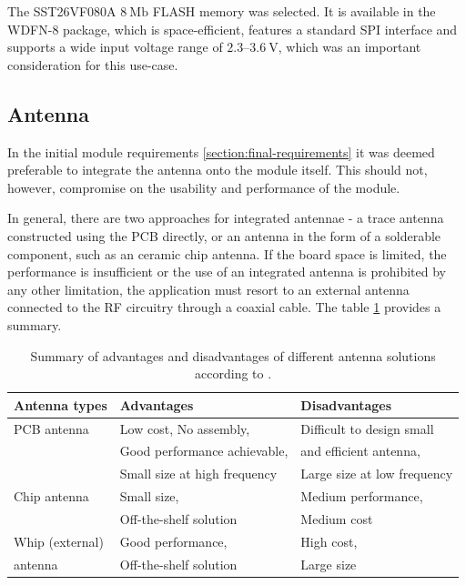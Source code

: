 The SST26VF080A $8~\mathrm{Mb}$ FLASH memory was selected. It is available in the WDFN-8 package, which is space-efficient, features a standard SPI interface and supports a wide input voltage range of $2.3\text{--}3.6~\mathrm{V}$, which was an important consideration for this use-case.

\subsection{\label{section:antenna}Antenna}
In the initial module requirements \ref{section:final-requirements} it was deemed preferable to integrate the antenna onto the module itself. This should not, however, compromise on the usability and performance of the module. 

In general, there are two approaches for integrated antennae - a trace antenna constructed using the PCB directly, or an antenna in the form of a solderable component, such as an ceramic chip antenna. If the board space is limited, the performance is insufficient or the use of an integrated antenna is prohibited by any other limitation, the application must resort to an external antenna connected to the RF circuitry through a coaxial cable. The table \ref{table:antenna-solutions} provides a summary.

\begin{table}[H]
\begin{center}
\caption{\label{table:antenna-solutions}Summary of advantages and disadvantages of different antenna solutions according to \cite{andersen_selecting_2008}.}
    \begin{tabular}{|l|l|l|}
    \hline
    \textbf{Antenna types} & \textbf{Advantages} & \textbf{Disadvantages} \\
    \hline
    PCB antenna  & Low cost, No assembly,        & Difficult to design small \\
                 & Good performance achievable,  & and efficient antenna, \\
                 & Small size at high frequency  & Large size at low frequency \\
    \hline
    Chip antenna & Small size,                   & Medium performance, \\
                 & Off-the-shelf solution        & Medium cost \\
    \hline
    Whip (external)& Good performance,           & High cost, \\
    antenna        & Off-the-shelf solution      & Large size \\
    \hline
    \end{tabular}
\end{center}
\end{table}

